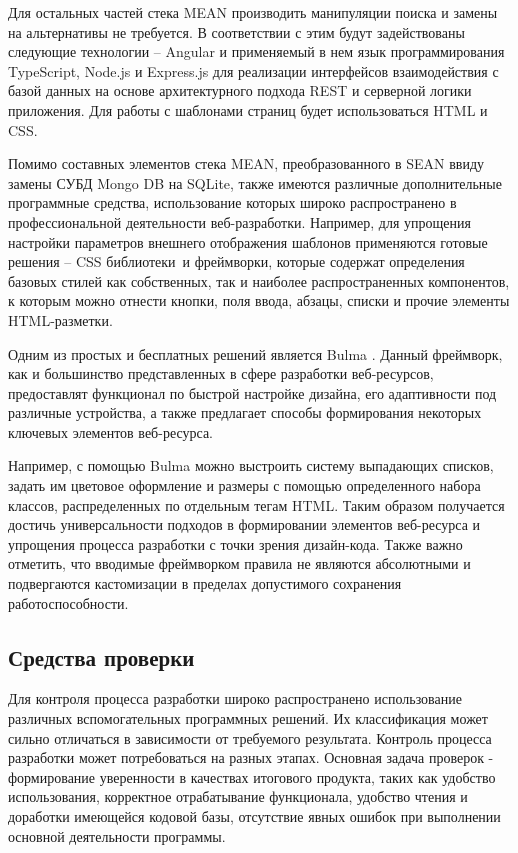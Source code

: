 Для остальных частей стека MEAN производить манипуляции поиска и замены на альтернативы не требуется.
В соответствии с этим будут задействованы следующие технологии -- Angular и применяемый в нем язык программирования TypeScript, Node.js и Express.js для реализации интерфейсов взаимодействия с базой данных на основе архитектурного подхода REST и серверной логики приложения.
Для работы с шаблонами страниц будет использоваться HTML и CSS.

Помимо составных элементов стека MEAN, преобразованного в SEAN ввиду замены СУБД Mongo DB на SQLite, также имеются различные дополнительные программные средства, использование которых широко распространено в профессиональной деятельности веб-разработки.
Например, для упрощения настройки параметров внешнего отображения шаблонов применяются готовые решения -- CSS библиотеки и фреймворки, которые содержат определения базовых стилей как собственных, так и наиболее распространенных компонентов, к которым можно отнести кнопки, поля ввода, абзацы, списки и прочие элементы HTML-разметки.

Одним из простых и бесплатных решений является Bulma \cite{bulma}.
Данный фреймворк, как и большинство представленных в сфере разработки веб-ресурсов, предоставлят функционал по быстрой настройке дизайна, его адаптивности под различные устройства, а также предлагает способы формирования некоторых ключевых элементов веб-ресурса.

Например, с помощью Bulma можно выстроить систему выпадающих списков, задать им цветовое оформление и размеры с помощью определенного набора классов, распределенных по отдельным тегам HTML.
Таким образом получается достичь универсальности подходов в формировании элементов веб-ресурса и упрощения процесса разработки с точки зрения дизайн-кода.
Также важно отметить, что вводимые фреймворком правила не являются абсолютными и подвергаются кастомизации в пределах допустимого сохранения работоспособности.

\subsection{Средства проверки}\label{средства-проверки}

Для контроля процесса разработки широко распространено использование различных вспомогательных программных решений.
Их классификация может сильно отличаться в зависимости от требуемого результата.
Контроль процесса разработки может потребоваться на разных этапах.
Основная задача проверок - формирование уверенности в качествах итогового продукта, таких как удобство использования, корректное отрабатывание функционала, удобство чтения и доработки имеющейся кодовой базы, отсутствие явных ошибок при выполнении основной деятельности программы.

